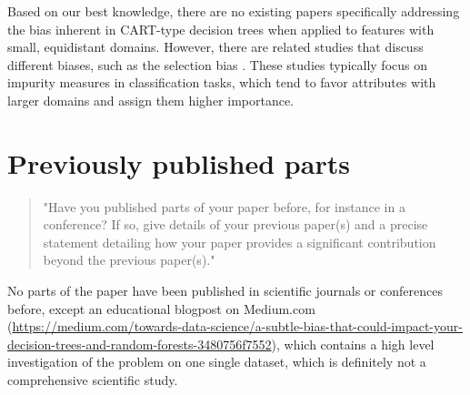 \documentclass{article}
\begin{document}
Based on our best knowledge, there are no existing papers specifically addressing the bias inherent in CART-type decision trees when applied to features with small, equidistant domains. However, there are related studies that discuss different biases, such as the selection bias \cite{bias0, bias1, bias2}. These studies typically focus on impurity measures in classification tasks, which tend to favor attributes with larger domains and assign them higher importance.

\section{Previously published parts}

\begin{quote}
    "Have you published parts of your paper before, for instance in a conference? If so, give details of your previous paper(s) and a precise statement detailing how your paper provides a significant contribution beyond the previous paper(s)."
\end{quote}

No parts of the paper have been published in scientific journals or conferences before, except an educational blogpost on Medium.com (\url{https://medium.com/towards-data-science/a-subtle-bias-that-could-impact-your-decision-trees-and-random-forests-3480756f7552}), which contains a high level investigation of the problem on one single dataset, which is definitely not a comprehensive scientific study.



\end{document}
